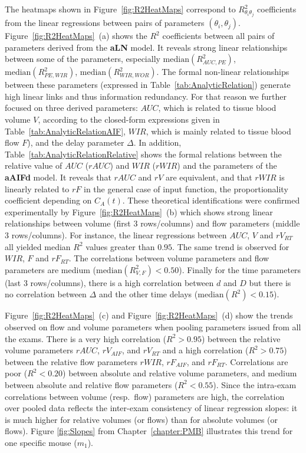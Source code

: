 The heatmaps shown in Figure~\ref{fig:R2HeatMaps} correspond to $R^2_{\theta_{i}\theta_{j}}$ coefficients from the linear regressions between pairs of parameters $\left(\theta_{i}, \theta_{j}\right)$. Figure~\ref{fig:R2HeatMaps}~(a) shows the $R^2$ coefficients between all pairs of parameters derived from the \textbf{aLN} model. It reveals strong linear relationships between some of the parameters, especially $\mathrm{median}\left(R^2_{AUC, PE}\right)$, $\mathrm{median}\left(R^2_{PE, WIR}\right)$, $\mathrm{median}\left(R^2_{WIR, WOR}\right)$. The formal non-linear relationships between these parameters (expressed in Table~\ref{tab:AnalyticRelation}) generate high linear links and thus information redundancy. For that reason we further focused on three derived parameters: $AUC$, which is related to tissue blood volume $V$, according to the closed-form expressions given in Table~\ref{tab:AnalyticRelationAIF}, $WIR$, which is mainly related to tissue blood flow $F$), and the delay parameter $\Delta$. In addition, Table~\ref{tab:AnalyticRelationRelative} shows the formal relations between the relative value of $AUC$ ($rAUC$) and $WIR$ ($rWIR$) and the parameters of the \textbf{aAIFd} model. It reveals that $rAUC$ and $rV$ are equivalent, and that $rWIR$ is linearly related to $rF$ in the general case of input function, the proportionality coefficient depending on $C_A\left(t\right)$. These theoretical identifications were confirmed experimentally by Figure~\ref{fig:R2HeatMaps}~(b) which shows strong linear relationships between volume (first 3 rows/columns) and flow parameters (middle 3 rows/columns). For instance, the linear regressions between $AUC$, $V$ and $rV_{RT}$ all yielded median $R^2$ values greater than $0.95$. The same trend is observed for $WIR$, $F$ and $rF_{RT}$. The correlations between volume parameters and flow parameters are medium ($\mathrm{median}\left(R^2_{V, F}\right) < 0.50$). Finally for the time parameters (last 3 rows/columns), there is a high correlation between $d$ and $D$ but there is no correlation between $\Delta$ and the other time delays ($\mathrm{median}\left(R^2\right) < 0.15$). 

Figure~\ref{fig:R2HeatMaps}~(c) and Figure~\ref{fig:R2HeatMaps}~(d) show the trends observed on flow and volume parameters when pooling parameters issued from all the exams. 
There is a very high correlation ($R^2 > 0.95$) between the relative volume parameters $rAUC$, $rV_{AIF}$, and $rV_{RT}$ and a high correlation ($R^2 > 0.75$) between the relative flow parameters $rWIR$, $rF_{AIF}$, and $rF_{RT}$. Correlations are poor ($R^2 < 0.20$) between absolute and relative volume parameters, and medium between absolute and relative flow parameters ($R^2< 0.55$). Since the intra-exam correlations between volume (resp.~flow) parameters are high, the correlation over pooled data reflects the inter-exam consistency of linear regression slopes: it is much higher for relative volumes (or flows) than for absolute volumes (or flows). Figure \ref{fig:Slopes} from Chapter~\ref{chapter:PMB} illustrates this trend for one specific mouse ($m_1$). 

